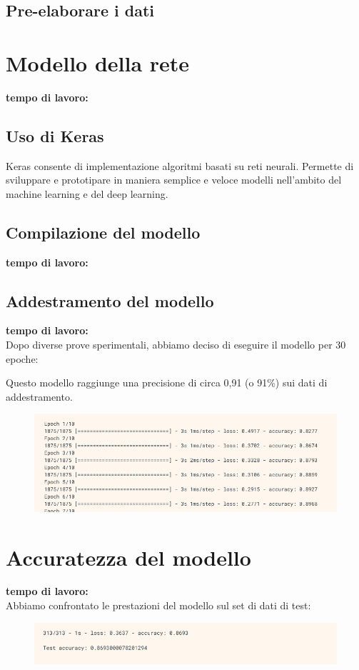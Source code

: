 \subsection{Pre-elaborare i dati}


\section{Modello della rete}
\textbf{tempo di lavoro:} \\
\newline
\subsection{Uso di Keras}
Keras consente di implementazione algoritmi basati su reti neurali. Permette di sviluppare e prototipare in maniera semplice e veloce modelli nell’ambito del machine learning e del deep learning.\\

\subsection{Compilazione del modello}
\textbf{tempo di lavoro:} \\
\newline
{}
\subsection{Addestramento del modello}
\textbf{tempo di lavoro:} \\
\newline
Dopo diverse prove sperimentali, abbiamo deciso di eseguire il modello per 30 epoche:

Questo modello raggiunge una precisione di circa 0,91 (o 91\%) sui dati di addestramento.
\begin{figure}[H]
	\centering
	\includegraphics[scale=0.70]{./images/img5.png}
\end{figure}

\section{Accuratezza del modello}
\textbf{tempo di lavoro:} \\
\newline
Abbiamo confrontato le prestazioni del modello sul set di dati di test:

\begin{figure}[H]
	\centering
	\includegraphics[scale=0.70]{./images/img6.png}
\end{figure}